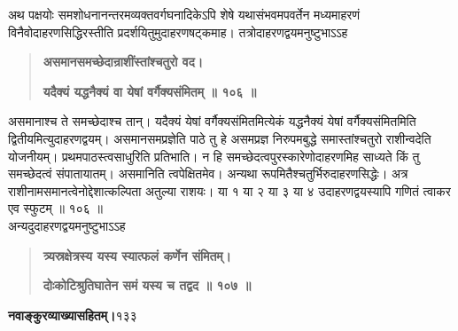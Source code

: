 \documentclass[11pt, openany]{book}
\begin{document}
\begin{sloppypar}
\hangindent=0.2in \hspace{0.2in}अथ पक्षयोः समशोधनानन्तरमव्यक्तवर्गघनादिकेऽपि शेषे यथासंभवमपवर्तेन मध्यमाहरणं विनैवोदाहरणसिद्धिरस्तीति प्रदर्शयितुमुदाहरणषट्कमाह। तत्रोदाहरणद्वयमनुष्टुभाऽऽह\textendash

\begin{quote}
\hspace{1in}\textbf{असमानसमच्छेदान्राशींस्तांश्चतुरो वद।}

\hspace{1in}\textbf{यदैक्यं यद्धनैक्यं वा येषां वर्गैक्यसंमितम् ॥ १०६ ॥}
\end{quote}

\hangindent=0.2in \hspace{0.2in}असमानाश्च ते समच्छेदाश्च तान्। यदैक्यं येषां वर्गैक्यसंमितमित्येकं यद्धनैक्यं येषां वर्गैक्यसंमितमिति द्वितीयमित्युदाहरणद्वयम्। असमानसमप्रज्ञेति पाठे तु हे असमप्रज्ञ निरुपमबुद्धे समास्तांश्चतुरो राशीन्वदेति योजनीयम्। प्रथमपाठस्त्वसाधुरिति प्रतिभाति। न हि समच्छेदत्वपुरस्कारेणोदाहरणमिह साध्यते किं तु समच्छेदत्वं संपातायातम्। असमानिति त्वपेक्षितमेव। अन्यथा रूपमितैश्चतुर्भिरुदाहरणसिद्धेः। अत्र राशीनामसमानत्वेनोद्देशात्कल्पिता अतुल्या राशयः। या १ या २ या ३ या ४ उदाहरणद्वयस्यापि गणितं त्वाकर एव स्फुटम् ॥ १०६ ॥ \\

\hangindent=0.2in \hspace{0.2in}अन्यदुदाहरणद्वयमनुष्टुभाऽऽह\textendash

\begin{quote}
\hspace{1in}\textbf{त्र्यस्रक्षेत्रस्य यस्य स्यात्फलं कर्णेन संमितम्।}

\hspace{1in}\textbf{दोःकोटिश्रुतिघातेन समं यस्य च तद्वद ॥ १०७ ॥}
\end{quote}
\end{sloppypar}
\thispagestyle{empty}
\newpage

\onehalfspacing
\hspace{2in}\textbf{नवाङ्कुरव्याख्यासहितम्।}\hspace{2in}१३३

\vspace{5mm}
\end{document}
